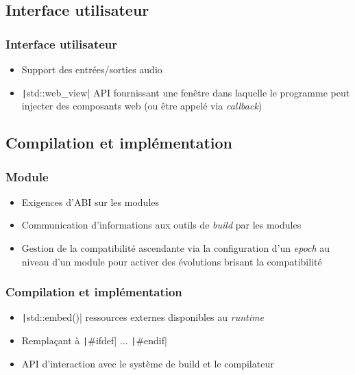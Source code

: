\documentclass[C++.tex]{subfiles}
\begin{document}
\subsection*{Interface utilisateur}
\begin{frame}[fragile]
	\frametitle{Interface utilisateur}
	\begin{itemize}
		\item Support des entrées/sorties audio
		\item \texttt|std::web_view| API fournissant une fenêtre dans laquelle le programme peut injecter des composants web (ou être appelé via \textit{callback})
	\end{itemize}
\end{frame}

\subsection*{Compilation et implémentation}
\begin{frame}[fragile]
	\frametitle{Module}
	\begin{itemize}
		\item Exigences d'ABI sur les modules
		\item Communication d'informations aux outils de \textit{build} par les modules
		\item Gestion de la compatibilité ascendante via la configuration d'un \textit{epoch} au niveau d'un module pour activer des évolutions brisant la compatibilité
	\end{itemize}

\end{frame}

\begin{frame}[fragile]
	\frametitle{Compilation et implémentation}
	\begin{itemize}
		\item \texttt|std::embed()| ressources externes disponibles au \textit{runtime}
		\item Remplaçant à \texttt|#ifdef| ... \texttt|#endif|
		\item API d'interaction avec le système de build et le compilateur
	\end{itemize}

\end{frame}
\end{document}
